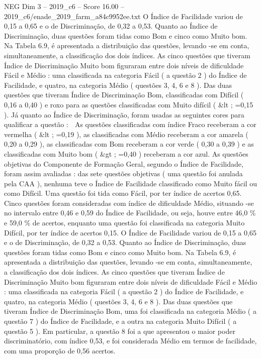 \begin{textsample}{NEG Dim 3 – 2019\_c6 – Score 16.00 – 2019\_c6/enade\_2019\_farm\_a84c9952ee.txt}
O Índice de Facilidade variou de 0,15 a 0,65 e o de Discriminação, de 0,32 a 0,53.
Quanto ao Índice de Discriminação, duas questões foram tidas como Bom e cinco como Muito bom.
Na Tabela 6.9, é apresentada a distribuição das questões, levando -se em conta, simultaneamente, a classificação dos dois índices.
As cinco questões que tiveram Índice de Discriminação Muito bom figuraram entre dois níveis de dificuldade Fácil e Médio : uma classificada na categoria Fácil ( a questão 2 ) do Índice de Facilidade, e quatro, na categoria Médio ( questões 3, 4, 6 e 8 ).
Das duas questões que tiveram Índice de Discriminação Bom, classificadas com Difícil ( 0,16 a 0,40 ) e roxo para as questões classificadas com Muito difícil ( \&lt ; =0,15 ).
Já quanto ao Índice de Discriminação, foram usadas as seguintes cores para qualificar a questão :  As questões classificadas com índice Fraco receberam a cor vermelha ( \&lt ; =0,19 ), as classificadas com Médio receberam a cor amarela ( 0,20 a 0,29 ), as classificadas com Bom receberam a cor verde ( 0,30 a 0,39 ) e as classificadas com Muito bom ( \&gt ; =0,40 ) receberam a cor azul.
As questões objetivas do Componente de Formação Geral, segundo o Índice de Facilidade, foram assim avaliadas : das sete questões objetivas ( uma questão foi anulada pela CAA ), nenhuma teve o Índice de Facilidade classificado como Muito fácil ou como Difícil.
Uma questão foi tida como Fácil, por ter índice de acertos 0,65.
Cinco questões foram consideradas com índice de dificuldade Médio, situando -se no intervalo entre 0,46 e 0,59 do Índice de Facilidade, ou seja, houve entre 46,0 \% e 59,0 \% de acertos, enquanto uma questão foi classificada na categoria Muito Difícil, por ter índice de acertos 0,15.
O Índice de Facilidade variou de 0,15 a 0,65 e o de Discriminação, de 0,32 a 0,53.
Quanto ao Índice de Discriminação, duas questões foram tidas como Bom e cinco como Muito bom.
Na Tabela 6.9, é apresentada a distribuição das questões, levando -se em conta, simultaneamente, a classificação dos dois índices.
As cinco questões que tiveram Índice de Discriminação Muito bom figuraram entre dois níveis de dificuldade Fácil e Médio : uma classificada na categoria Fácil ( a questão 2 ) do Índice de Facilidade, e quatro, na categoria Médio ( questões 3, 4, 6 e 8 ).
Das duas questões que tiveram Índice de Discriminação Bom, uma foi classificada na categoria Médio ( a questão 7 ) do Índice de Facilidade, e a outra na categoria Muito Difícil ( a questão 5 ).
Em particular, a questão 8 foi a que apresentou o maior poder discriminatório, com índice 0,53, e foi considerada Médio em termos de facilidade, com uma proporção de 0,56 acertos.

\end{textsample}
